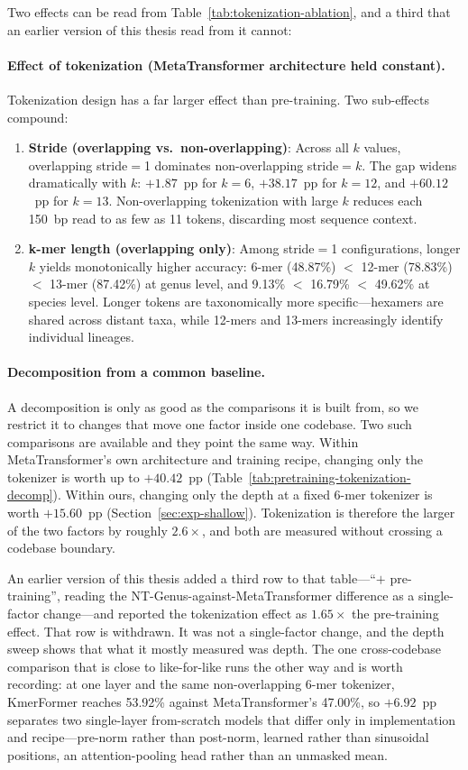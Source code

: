 Two effects can be read from Table~\ref{tab:tokenization-ablation}, and a third that an earlier version of this thesis read from it cannot:

\paragraph{Effect of tokenization (MetaTransformer architecture held constant).}
Tokenization design has a far larger effect than pre-training. Two sub-effects compound:
\begin{enumerate}
    \item \textbf{Stride (overlapping vs.\ non-overlapping)}: Across all $k$ values, overlapping stride$=$1 dominates non-overlapping stride$=k$. The gap widens dramatically with $k$: $+1.87$~pp for $k=6$, $+38.17$~pp for $k=12$, and $+60.12$~pp for $k=13$. Non-overlapping tokenization with large $k$ reduces each 150~bp read to as few as 11 tokens, discarding most sequence context.
    \item \textbf{k-mer length (overlapping only)}: Among stride$=$1 configurations, longer $k$ yields monotonically higher accuracy: 6-mer (48.87\%) $<$ 12-mer (78.83\%) $<$ 13-mer (87.42\%) at genus level, and 9.13\% $<$ 16.79\% $<$ 49.62\% at species level. Longer tokens are taxonomically more specific---hexamers are shared across distant taxa, while 12-mers and 13-mers increasingly identify individual lineages.
\end{enumerate}

\paragraph{Decomposition from a common baseline.}
A decomposition is only as good as the comparisons it is built from, so we restrict it to changes that move one factor inside one codebase. Two such comparisons are available and they point the same way. Within MetaTransformer's own architecture and training recipe, changing only the tokenizer is worth up to $+40.42$~pp (Table~\ref{tab:pretraining-tokenization-decomp}). Within ours, changing only the depth at a fixed 6-mer tokenizer is worth $+15.60$~pp (Section~\ref{sec:exp-shallow}). Tokenization is therefore the larger of the two factors by roughly $2.6\times$, and both are measured without crossing a codebase boundary.

An earlier version of this thesis added a third row to that table---``$+$ pre-training'', reading the NT-Genus-against-MetaTransformer difference as a single-factor change---and reported the tokenization effect as $1.65\times$ the pre-training effect. That row is withdrawn. It was not a single-factor change, and the depth sweep shows that what it mostly measured was depth. The one cross-codebase comparison that is close to like-for-like runs the other way and is worth recording: at one layer and the same non-overlapping 6-mer tokenizer, KmerFormer reaches 53.92\% against MetaTransformer's 47.00\%, so $+6.92$~pp separates two single-layer from-scratch models that differ only in implementation and recipe---pre-norm rather than post-norm, learned rather than sinusoidal positions, an attention-pooling head rather than an unmasked mean.

